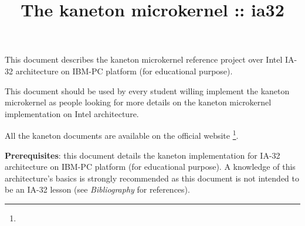 %
%
%
%
%
%

%
%

%
%

\def\path{../../..}

%
%



%
%


%
%

\title{The kaneton microkernel :: ia32 \\
       \version
       \logo}

%
%



%
%

\maketitle

%
%

This document describes the kaneton microkernel reference project over
Intel IA-32 architecture on IBM-PC platform (for educational purpose).

\-

This document should be used by every student willing implement the
kaneton microkernel as people looking for more details on the kaneton
microkernel implementation on Intel architecture.

\-

All the kaneton documents are available on
the official website
  \footnote{}.

\-

\textbf{Prerequisites}: this document details the kaneton implementation
for IA-32 architecture on IBM-PC platform (for educational purpose). A
knowledge of this architecture's basics is strongly recommended as
this document is not intended to be an IA-32 lesson (see
\textit{Bibliography} for references).

%
%

\tableofcontents

%
%

\indentation{}

%
%














